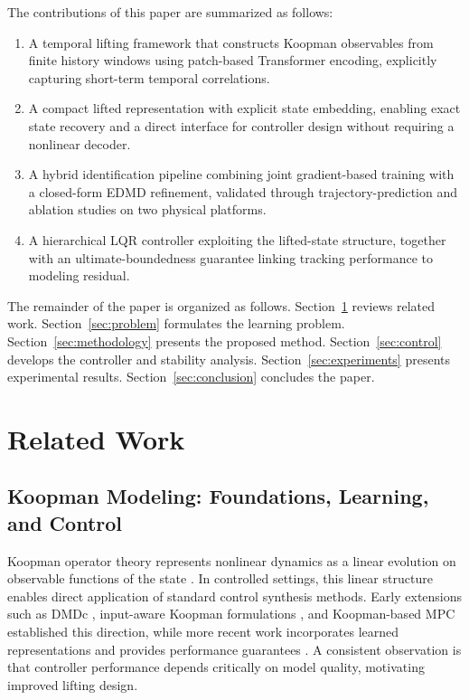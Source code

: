 \documentclass[journal]{IEEEtran}
\begin{document}
The contributions of this paper are summarized as follows:
\begin{enumerate}
    \item A temporal lifting framework that constructs Koopman observables from finite history windows using patch-based Transformer encoding, explicitly capturing short-term temporal correlations.
    \item A compact lifted representation with explicit state embedding, enabling exact state recovery and a direct interface for controller design without requiring a nonlinear decoder.
    \item A hybrid identification pipeline combining joint gradient-based training with a closed-form EDMD refinement, validated through trajectory-prediction and ablation studies on two physical platforms.
    \item A hierarchical LQR controller exploiting the lifted-state structure, together with an ultimate-boundedness guarantee linking tracking performance to modeling residual.
\end{enumerate}

The remainder of the paper is organized as follows. Section~\ref{sec:related_work} reviews related work. Section~\ref{sec:problem} formulates the learning problem. Section~\ref{sec:methodology} presents the proposed method. Section~\ref{sec:control} develops the controller and stability analysis. Section~\ref{sec:experiments} presents experimental results. Section~\ref{sec:conclusion} concludes the paper.



\section{Related Work}
\label{sec:related_work}

\subsection{Koopman Modeling: Foundations, Learning, and Control}

Koopman operator theory represents nonlinear dynamics as a linear evolution on observable functions of the state \cite{koopman1931hamiltonian, koopman1932spectra, mezic2005spectral, rowley2009spectral}. In controlled settings, this linear structure enables direct application of standard control synthesis methods. Early extensions such as DMDc \cite{proctor2016dmdc}, input-aware Koopman formulations \cite{proctor2018generalizing, brunton2016invariant}, and Koopman-based MPC \cite{korda2018linear} established this direction, while more recent work incorporates learned representations and provides performance guarantees \cite{han2020deep, shi2022deep, strasser2026overview, duran2025control}. A consistent observation is that controller performance depends critically on model quality, motivating improved lifting design.
\end{document}
